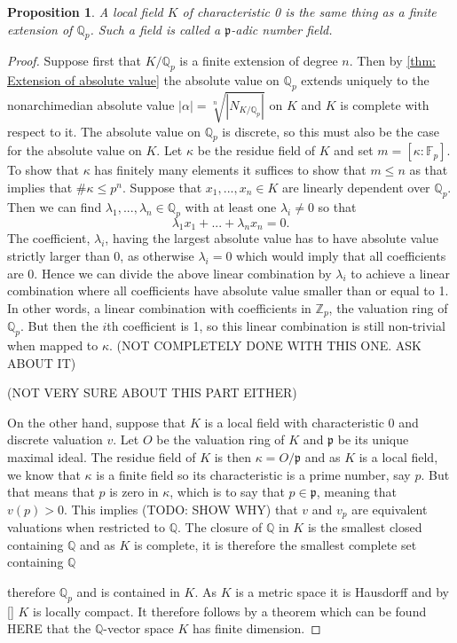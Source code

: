\documentclass{article}
\newtheorem{proposition}{Proposition}[section]
\newcommand{\mfrak}[1]{\mathfrak{#1}}
\newcommand{\mbb}[1]{\mathbb{#1}}
\begin{document}
\begin{proposition}\label{prop: Characterization of local fields}
    A local field $K$ of characteristic 0 is the same thing as a finite extension of $\mbb Q_p$. Such a field is called a $\mfrak p$-adic number field. 
\end{proposition}
\begin{proof}
    Suppose first that $K /\mbb Q_p$ is a finite extension of degree $n$. Then by \cref{thm: Extension of absolute value} the absolute value on $\mbb Q_p$ extends uniquely to the nonarchimedian absolute value $|\alpha| = \sqrt[n]{|N_{K/\mbb Q_p}|}$ on $K$ and $K$ is complete with respect to it. The absolute value on $\mbb Q_p$ is discrete, so this must also be the case for the absolute value on $K$. Let $\kappa$ be the residue field of $K$ and set $m = [\kappa : \mbb F_p]$. To show that $\kappa$ has finitely many elements it suffices to show that $m \leq n$ as that implies that $\# \kappa \leq p^n$. Suppose that $x_1, ..., x_n \in K$ are linearly dependent over $\mbb Q_p$. Then we can find $\lambda_1, ..., \lambda_n \in \mbb Q_p$ with at least one $\lambda_i \neq 0$ so that 
    $$\lambda_1 x_1 + ... + \lambda_n x_n = 0.$$ 
    The coefficient, $\lambda_i$, having the largest absolute value has to have absolute value strictly larger than 0, as otherwise $\lambda_i = 0$ which would imply that all coefficients are 0. Hence we can divide the above linear combination by $\lambda_i$ to achieve a linear combination where all coefficients have absolute value smaller than or equal to 1. In other words, a linear combination with coefficients in $\mbb Z_p$, the valuation ring of $\mbb Q_p$. But then the $i$th coefficient is 1, so this linear combination is still non-trivial when mapped to $\kappa$. (NOT COMPLETELY DONE WITH THIS ONE. ASK ABOUT IT)


    (NOT VERY SURE ABOUT THIS PART EITHER)

    On the other hand, suppose that $K$ is a local field with characteristic 0 and discrete valuation $v$. Let $O$ be the valuation ring of $K$ and $\mfrak p$ be its unique maximal ideal. The residue field of $K$ is then $\kappa = O / \mfrak p$ and as $K$ is a local field, we know that $\kappa$ is a finite field so its characteristic is a prime number, say $p$. But that means that $p$ is zero in $\kappa$, which is to say that $p \in \mfrak p$, meaning that $v(p) > 0$.  This implies (TODO: SHOW WHY) that $v$ and $v_p$ are equivalent valuations when restricted to $\mbb Q$. The closure of $\mbb Q$ in $K$ is the smallest closed containing $\mbb Q$ and as $K$ is complete, it is therefore the smallest complete set containing $\mbb Q$   
    
    therefore $\mbb Q_p$ and is contained in $K$. As $K$ is a metric space it is Hausdorff and by \ref{} $K$ is locally compact. It therefore follows by a theorem which can be found HERE that the $\mbb Q$-vector space $K$ has finite dimension. 
\end{proof}
\end{document}
